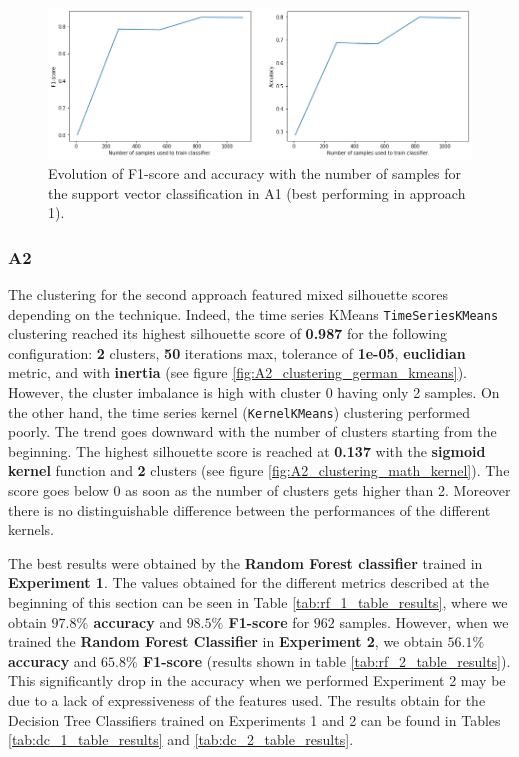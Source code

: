 \documentclass[sigplan,screen]{acmart}
\begin{document}
\begin{figure}[h]
    \centering
    \includegraphics[width=\linewidth]{reports/figures/A1_classification_svc_nocluster.png}
    \caption{Evolution of F1-score and accuracy with the number of samples for the support vector classification in A1 (best performing in approach 1).}
    \label{fig:A1_classification_svc_noscluter}
\end{figure}

\subsubsection{A2}

The clustering for the second approach featured mixed silhouette scores depending on the technique. Indeed, the time series KMeans \texttt{TimeSeriesKMeans} clustering reached its highest silhouette score of \textbf{0.987} for the following configuration: \textbf{2} clusters, \textbf{50} iterations max, tolerance of \textbf{1e-05}, \textbf{euclidian} metric, and with \textbf{inertia} (see figure \ref{fig:A2_clustering_german_kmeans}). However, the cluster imbalance is high with cluster 0 having only 2 samples.
On the other hand, the time series kernel (\texttt{KernelKMeans}) clustering performed poorly. The trend goes downward with the number of clusters starting from the beginning. The highest silhouette score is reached at \textbf{0.137} with the \textbf{sigmoid kernel} function and \textbf{2} clusters (see figure \ref{fig:A2_clustering_math_kernel}). The score goes below 0 as soon as the number of clusters gets higher than 2. Moreover there is no distinguishable difference between the performances of the different kernels.

The best results were obtained by the \textbf{Random Forest classifier} trained in \textbf{Experiment 1}. The values obtained for the different metrics described at the beginning of this section can be seen in Table \ref{tab:rf_1_table_results}, where we obtain \textbf{$97.8\%$ accuracy} and \textbf{$98.5\%$ F1-score} for $962$ samples. However, when we trained the \textbf{Random Forest Classifier} in \textbf{Experiment 2}, we obtain \textbf{$56.1\%$ accuracy} and \textbf{$65.8\%$ F1-score} (results shown in table \ref{tab:rf_2_table_results}). This significantly drop in the accuracy when we performed Experiment 2 may be due to a lack of expressiveness of the features used. The results obtain for the Decision Tree Classifiers trained on Experiments 1 and 2 can be found in Tables \ref{tab:dc_1_table_results} and \ref{tab:dc_2_table_results}.
\end{document}
